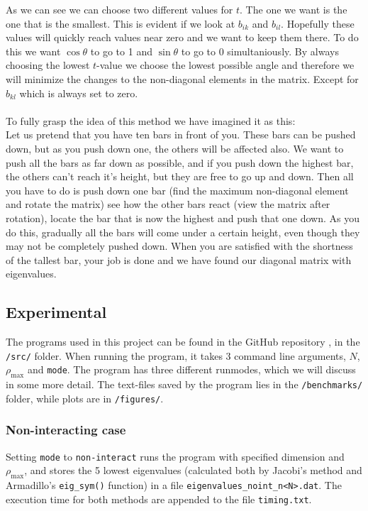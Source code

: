 \documentclass{article}
\newcommand{\husk}[1]{\color{red} #1 \color{black}}
\begin{document}
As we can see we can choose two different values for $t$. The one we want is the one that is the smallest. This is evident if we look at $b_{ik}$ and $b_{il}$. Hopefully these values will quickly reach values near zero and  we want to keep them there. To do this we want $\cos \theta$ to go to 1 and $\sin \theta$ to go to 0 simultaniously. By always choosing the lowest $t$-value we choose the lowest possible angle and therefore we will minimize the changes to the non-diagonal elements in the matrix. Except for $b_{kl}$ which is always set to zero. \\ \\

To fully grasp the idea of this method we have imagined it as this: \\
Let us pretend that you have ten bars in front of you. These bars can be pushed down, but as you push down one, the others will be affected also. We want to push all the bars as far down as possible, and if you push down the highest bar, the others can't reach it's height, but they are free to go up and down. Then all you have to do is push down one bar (find the maximum non-diagonal element and rotate the matrix) see how the other bars react (view the matrix after rotation), locate the bar that is now the highest and push that one down. As you do this, gradually all the bars will come under a certain height, even though they may not be completely pushed down. When you are satisfied with the shortness of the tallest bar, your job is done and we have found our diagonal matrix with eigenvalues.

\subsection{Experimental}
The programs used in this project can be found in the GitHub repository \cite{Github}, in the \texttt{/src/} folder. When running the program, it takes 3 command line arguments, $N$, $\rho_{\text{max}}$ and \texttt{mode}. The program has three different runmodes, which we will discuss in some more detail. The text-files saved by the program lies in the \texttt{/benchmarks/} folder, while plots are in \texttt{/figures/}.
\subsubsection{Non-interacting case}
Setting \texttt{mode} to \texttt{non-interact} runs the program with specified dimension and $\rho_{\text{max}}$, and stores the 5 lowest eigenvalues (calculated both by Jacobi's method and Armadillo's \texttt{eig\_sym()} function) in a file \texttt{eigenvalues\_noint\_n<N>.dat}. The execution time for both methods are appended to the file \texttt{timing.txt}.
\end{document}
